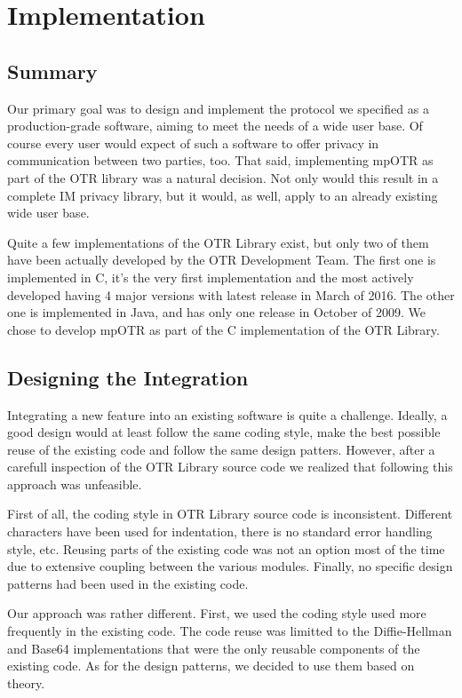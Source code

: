 \chapter{Implementation}
\label{chapter:implementation}


\section{Summary}
Our primary goal was to design and implement the protocol we specified as a production-grade software, aiming to meet the needs of a wide user base. Of course every user would expect of such a software to offer privacy in communication between two parties, too. That said, implementing mpOTR as part of the OTR library was a natural decision. Not only would this result in a complete IM privacy library, but it would, as well, apply to an already existing wide user base.

Quite a few implementations of the OTR Library exist, but only two of them have been actually developed by the OTR Development Team. The first one is implemented in C, it's the very first implementation and the most actively developed having 4 major versions with latest release in March of 2016. The other one is implemented in Java, and has only one release in October of 2009. We chose to develop mpOTR as part of the C implementation of the OTR Library.


\section{Designing the Integration}
Integrating a new feature into an existing software is quite a challenge. Ideally, a good design would at least follow the same coding style, make the best possible reuse of the existing code and follow the same design patters. However, after a carefull inspection of the OTR Library source code we realized that following this approach was unfeasible.

First of all, the coding style in OTR Library source code is inconsistent. Different characters have been used for indentation, there is no standard error handling style, etc. Reusing parts of the existing code was not an option most of the time due to extensive coupling between the various modules. Finally, no specific design patterns had been used in the existing code.

Our approach was rather different. First, we used the coding style used more frequently in the existing code. The code reuse was limitted to the Diffie-Hellman and Base64 implementations that were the only reusable components of the existing code. As for the design patterns, we decided to use them based on theory.


